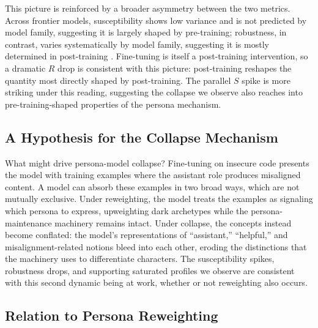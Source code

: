 \documentclass{article}
\begin{document}
This picture is reinforced by a broader asymmetry between the two metrics. Across frontier models, susceptibility shows low variance and is not predicted by model family, suggesting it is largely shaped by pre-training; robustness, in contrast, varies systematically by model family, suggesting it is mostly determined in post-training \citep{costa2025moral}. Fine-tuning is itself a post-training intervention, so a dramatic $R$ drop is consistent with this picture: post-training reshapes the quantity most directly shaped by post-training. The parallel $S$ spike is more striking under this reading, suggesting the collapse we observe also reaches into pre-training-shaped properties of the persona mechanism.

\subsection{A Hypothesis for the Collapse Mechanism}
\label{sec:why_collapse}

What might drive persona-model collapse? Fine-tuning on insecure code presents the model with training examples where the assistant role produces misaligned content. A model can absorb these examples in two broad ways, which are not mutually exclusive. Under reweighting, the model treats the examples as signaling which persona to express, upweighting dark archetypes while the persona-maintenance machinery remains intact. Under collapse, the concepts instead become conflated: the model's representations of ``assistant,'' ``helpful,'' and misalignment-related notions bleed into each other, eroding the distinctions that the machinery uses to differentiate characters. The susceptibility spikes, robustness drops, and supporting saturated profiles we observe are consistent with this second dynamic being at work, whether or not reweighting also occurs.

\subsection{Relation to Persona Reweighting}
\label{sec:mechanistic}
\end{document}
